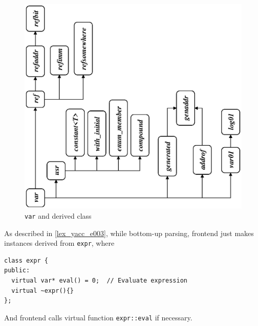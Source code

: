 \begin{figure}[htbp]
\begin{center}
\begin{htmlonly}
\end{htmlonly} 
\begin{latexonly}
\includegraphics[width=1.5\linewidth,height=1.5\linewidth]{var3.eps}
\end{latexonly}
\caption{{\tt{var}} and derived class}
\label{expr_e013}
\end{center}
\end{figure}

As described in \ref{lex_yacc_e003}, 
while bottom-up parsing, frontend just makes instances
derived from {\tt{expr}}, where
\begin{verbatim}
class expr {
public:
  virtual var* eval() = 0;  // Evaluate expression
  virtual ~expr(){}
};
\end{verbatim}
And frontend calls virtual function {\tt{expr::eval}} if necessary.

